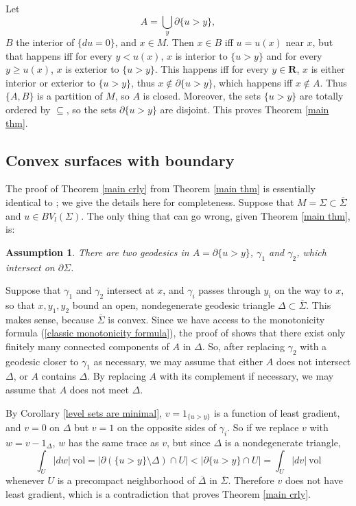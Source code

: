 \documentclass[reqno,12pt,letterpaper]{amsart}
\newcommand{\RR}{\mathbf{R}}
\newcommand{\vol}{\mathrm{vol}}
\newtheorem{assumption}[theorem]{Assumption}
\theoremstyle{definition}
\numberwithin{equation}{section}
\begin{document}
Let
\begin{equation}\label{lamination union}
A = \bigcup_y \partial \{u > y\},
\end{equation} $B$ the interior of $\{du = 0\}$, and $x \in M$.
Then $x \in B$ iff $u = u(x)$ near $x$, but that happens iff for every $y < u(x)$, $x$ is interior to $\{u > y\}$ and for every $y \geq u(x)$, $x$ is exterior to $\{u > y\}$.
This happens iff for every $y \in \RR$, $x$ is either interior or exterior to $\{u > y\}$, thus $x \notin \partial \{u > y\}$, which happens iff $x \notin A$.
Thus $\{A, B\}$ is a partition of $M$, so $A$ is closed.
Moreover, the sets $\{u > y\}$ are totally ordered by $\subseteq$, so the sets $\partial \{u > y\}$ are disjoint.
This proves Theorem \ref{main thm}.

\subsection{Convex surfaces with boundary}
The proof of Theorem \ref{main crly} from Theorem \ref{main thm} is essentially identical to \cite[Proposition 3.4]{górny2017planar}; we give the details here for completeness.
Suppose that $M = \Sigma \subset \overline \Sigma$ and $u \in BV_l(\Sigma)$.
The only thing that can go wrong, given Theorem \ref{main thm}, is:

\begin{assumption}
There are two geodesics in $A = \partial \{u > y\}$, $\gamma_1$ and $\gamma_2$, which intersect on $\partial \Sigma$.
\end{assumption}

Suppose that $\gamma_1$ and $\gamma_2$ intersect at $x$, and $\gamma_i$ passes through $y_i$ on the way to $x$, so that $x,y_1,y_2$ bound an open, nondegenerate geodesic triangle $\Delta \subset \overline \Sigma$. This makes sense, because $\overline \Sigma$ is convex.
Since we have access to the monotonicity formula (\ref{classic monotonicity formula}), the proof of \cite[Remark 37.9]{simon1983GMT} shows that there exist only finitely many connected components of $A$ in $\Delta$.
So, after replacing $\gamma_2$ with a geodesic closer to $\gamma_1$ as necessary, we may assume that either $A$ does not intersect $\Delta$, or $A$ contains $\Delta$.
By replacing $A$ with its complement if necessary, we may assume that $A$ does not meet $\Delta$.

By Corollary \ref{level sets are minimal}, $v = 1_{\{u > y\}}$ is a function of least gradient, and $v = 0$ on $\Delta$ but $v = 1$ on the opposite sides of $\gamma_i$.
So if we replace $v$ with $w = v - 1_\Delta$, $w$ has the same trace as $v$, but since $\Delta$ is a nondegenerate triangle,
$$\int_U |dw| ~\vol = |\partial(\{u > y\} \setminus \Delta) \cap U| < |\partial \{u > y\} \cap U| = \int_U |dv| ~\vol$$
whenever $U$ is a precompact neighborhood of $\overline \Delta$ in $\overline \Sigma$.
Therefore $v$ does not have least gradient, which is a contradiction that proves Theorem \ref{main crly}.





\printbibliography
\end{document}
